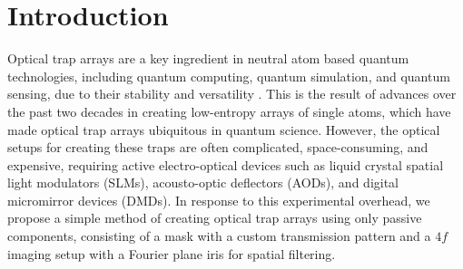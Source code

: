 
\section{Introduction}
Optical trap arrays are a key ingredient in neutral atom based quantum technologies, including quantum computing, quantum simulation, and quantum sensing, due to their stability and versatility \cite{Kaufman2021,Morgado2021}. This is the result of advances over the past two decades in creating low-entropy arrays of single atoms, which have made optical trap arrays ubiquitous in quantum science. However, the optical setups for creating these traps are often complicated, space-consuming, and expensive, requiring active electro-optical devices such as liquid crystal spatial light modulators (SLMs)\cite{DKim2019}, acousto-optic deflectors (AODs)\cite{Graham2022}, and digital micromirror devices (DMDs)\cite{YWang2020}. In response to this experimental overhead, we propose a simple method of creating optical trap arrays using only passive components, consisting of a mask with a custom transmission pattern and a $4f$ imaging setup with a Fourier plane iris for spatial filtering.

